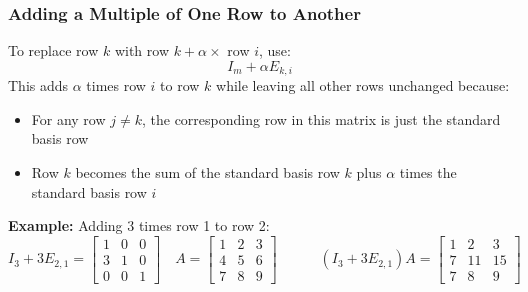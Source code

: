 \documentclass[a4paper, 9pt]{extarticle}
\begin{document}
\subsubsection{Adding a Multiple of One Row to Another}
To replace row $k$ with row $k + \alpha \times$ row $i$, use:
$$I_m + \alpha E_{k,i}$$
This adds $\alpha$ times row $i$ to row $k$ while leaving all other rows unchanged because:
\begin{itemize}
  \item For any row $j \neq k$, the corresponding row in this matrix is just the standard basis row
  \item Row $k$ becomes the sum of the standard basis row $k$ plus $\alpha$ times the standard basis row $i$
\end{itemize}
\textbf{Example:} Adding 3 times row 1 to row 2:
\vspace{-1ex}
$$ I_3 + 3E_{2,1} = \begin{bmatrix}
    1 & 0 & 0 \\
    3 & 1 & 0 \\
    0 & 0 & 1
  \end{bmatrix} \quad A = \begin{bmatrix}
    1 & 2 & 3 \\
    4 & 5 & 6 \\
    7 & 8 & 9
  \end{bmatrix}
  \quad\quad\quad
  (I_3 + 3E_{2,1})A = \begin{bmatrix}
    1 & 2  & 3  \\
    7 & 11 & 15 \\
    7 & 8  & 9
  \end{bmatrix}$$
\end{document}

